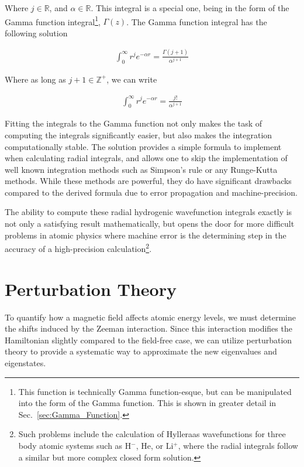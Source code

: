            Where $j \in \mathbb{R}$, and $\alpha \in \mathbb{R}$. This integral is a special one, being in the form of the Gamma function integral\footnote{This function is technically Gamma function-esque, but can be manipulated into the form of the Gamma function. This is shown in greater detail in Sec.~\ref{sec:Gamma_Function}.}, $\Gamma(z)$. The Gamma function integral has the following solution 

            \begin{align}
                \int_0^\infty r^j e^{-\alpha r} = \frac{\Gamma(j + 1)}{\alpha^{j + 1}}
            \end{align}

            Where as long as $j + 1 \in \mathbb{Z}^+$, we can write

            \begin{align}
                \int_0^\infty r^j e^{-\alpha r} = \frac{j!}{\alpha^{j + 1}}
            \end{align}

            Fitting the integrals to the Gamma function not only makes the task of computing the integrals significantly easier, but also makes the integration computationally stable. The solution provides a simple formula to implement when calculating radial integrals, and allows one to skip the implementation of well known integration methods such as Simpson's rule or any Runge-Kutta methods. While these methods are powerful, they do have significant drawbacks compared to the derived formula due to error propagation and machine-precision.
            
            The ability to compute these radial hydrogenic wavefunction integrals exactly is not only a satisfying result mathematically, but opens the door for more difficult problems in atomic physics where machine error is the determining step in the accuracy of a high-precision calculation\footnote{Such problems include the calculation of Hylleraas wavefunctions for three body atomic systems such as H$^-$, He, or Li$^+$, where the radial integrals follow a similar but more complex closed form solution.}.
            
            

    \section{Perturbation Theory} \label{sec:Perturbation_Theory}
        To quantify how a magnetic field affects atomic energy levels, we must determine the shifts induced by the Zeeman interaction. Since this interaction modifies the Hamiltonian slightly compared to the field-free case, we can utilize perturbation theory to provide a systematic way to approximate the new eigenvalues and eigenstates.\\

